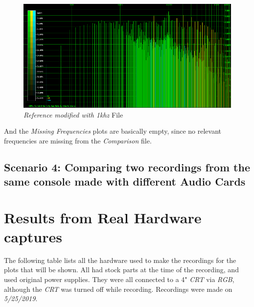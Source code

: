 \documentclass[10pt,a4paper]{report}
\begin{document}
\begin{figure}[H]
	\centering
	\includegraphics[width=1.0\linewidth]{plots/Plot3-Spectrogram-1khz}
	\caption[Reference File]{\textit{Reference modified with 1khz} File}
	\label{fig:plot3-spectrogram-1khz}
\end{figure}


And the \textit{Missing Frequencies} plots are basically empty, since no relevant frequencies are missing from the \textit{Comparison} file.

\section{Scenario 4: Comparing two recordings from the same console made with different Audio Cards}

\chapter{Results from Real Hardware captures}

The following table lists all the hardware used to make the recordings for the plots that will be shown. All had stock parts at the time of the recording, and used original power supplies. They were all connected to a 4" \textit{CRT} via \textit{RGB}, although the \textit{CRT} was turned off while recording. Recordings were made on \textit{5/25/2019}.
\end{document}
